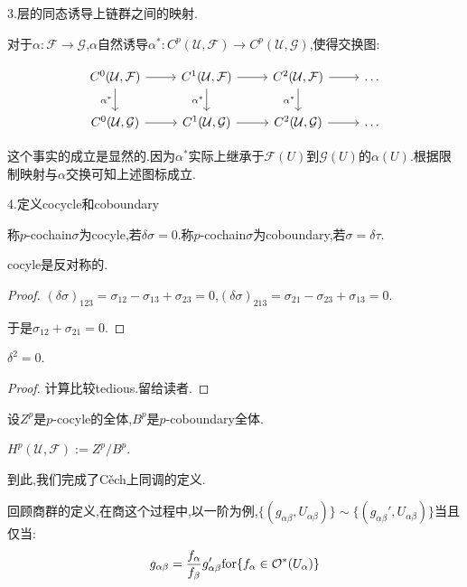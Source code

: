 3.层的同态诱导上链群之间的映射.

对于$\alpha:\mathcal{F} \to \mathcal{G}$,$\alpha$自然诱导$\alpha^*:C^p(\mathcal{U},\mathcal{F}) \to C^p(\mathcal{U},\mathcal{G})$,使得交换图:

\[\begin{tikzcd}
	{C^0(\mathcal{U},\mathcal{F})} & {C^1(\mathcal{U},\mathcal{F})} & {C^2(\mathcal{U},\mathcal{F})} & \dots \\
	{C^0(\mathcal{U},\mathcal{G})} & {C^1(\mathcal{U},\mathcal{G})} & {C^2(\mathcal{U},\mathcal{G})} & \dots
	\arrow[from=1-1, to=1-2]
	\arrow["\alpha^*"', from=1-1, to=2-1]
	\arrow[from=1-2, to=1-3]
	\arrow["\alpha^*"', from=1-2, to=2-2]
	\arrow[from=1-3, to=1-4]
	\arrow["\alpha^*"', from=1-3, to=2-3]
	\arrow[from=2-1, to=2-2]
	\arrow[from=2-2, to=2-3]
	\arrow[from=2-3, to=2-4]
\end{tikzcd}\]

这个事实的成立是显然的.因为$\alpha^*$实际上继承于$\mathcal{F}(U)$到$\mathcal{G}(U)$的$\alpha(U)$.根据限制映射与$\alpha$交换可知上述图标成立.

4.定义cocycle和coboundary
\begin{definition}
	称$p$-cochain$\sigma$为cocyle,若$\delta \sigma=0$.称$p$-cochain$\sigma$为coboundary,若$\sigma=\delta \tau$.
\end{definition}

\begin{proposition}
	cocyle是反对称的.
\end{proposition}
\begin{proof}
	$(\delta\sigma)_{123}=\sigma_{12}-\sigma_{13}+\sigma_{23}=0$,$(\delta\sigma)_{213}=\sigma_{21}-\sigma_{23}+\sigma_{13}=0$.

	于是$\sigma_{12}+\sigma_{21}=0$.
\end{proof}

\begin{proposition}
	$\delta^2=0$.
\end{proposition}
\begin{proof}
	计算比较tedious.留给读者.
\end{proof}
设$Z^p$是$p$-cocyle的全体,$B^p$是$p$-coboundary全体.
\begin{definition}[C\v{e}ch上同调]
	$H^p(\mathcal{U},\mathcal{F}):=Z^p/B^p$.
\end{definition}

到此,我们完成了C\v{e}ch上同调的定义.

回顾商群的定义,在商这个过程中,以一阶为例,$\{(g_{\alpha\beta},U_{\alpha\beta})\}\sim\{(g_{\alpha\beta}',U_{\alpha\beta})\}$当且仅当:
\begin{align*}
	g_{\alpha\beta}=\frac{f_\alpha}{f_\beta} g_{\alpha\beta}'
	\text{for}\{f_\alpha\in \mathcal{O}^*(U_\alpha)\}
\end{align*}


